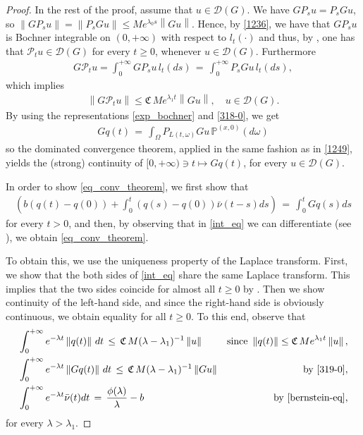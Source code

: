 \documentclass[reqno]{amsart}
\theoremstyle{remark}
\numberwithin{equation}{section} %
\newcommand{\DD}{\mathcal{D}}
\newcommand{\1}{\mathds{1}}
\begin{document}
\begin{proof}
		In the rest of the proof, assume that $u \in \mathcal{D}(G)$. We have $GP_su=P_sGu$, so  $\left\|  GP_s u\right\| = \left\|  P_s Gu\right\| \leq { M e^{\lambda_0 s}} \left\| Gu \right\|$. Hence, {by \eqref{1236}, we have that $GP_su$ is Bochner integrable on $(0, +\infty)$ with respect to $l_t(\cdot)$} and thus, by \cite[Proposition 3.7.12]{hille1996functional}, one has that $\mathcal{P}_tu \in \mathcal{D}(G)$ for every $t \geq 0$, whenever $u \in \mathcal{D}(G)$. Furthermore
		\begin{align}
			G\mathcal{P}_t u = \int_0^{+\infty} GP_su \, l_t(ds) \, = \, \int_0^{+\infty} P_sGu \, l_t(ds),
			\label{318-0}
		\end{align}
		which implies
		\begin{align}
			\left\| G \mathcal{P}_tu  \right\| \leq {\mathfrak{C}\,Me^{\lambda_1 t}} \left\| Gu \right\|, \quad u\in \DD(G).
			\label{319-0}
		\end{align}
		By using the representations \eqref{exp_bochner} and \eqref{318-0}, we get
		\begin{align}
			Gq(t) \, = \, \int_{\Omega} P_{L(t, \omega)} G u \, \mathds{P}^{(x,0)}(d\omega)
		\end{align}
		so the dominated convergence theorem, {applied in the same fashion as in \eqref{1249}}, yields the (strong) continuity of $[0, +\infty) \ni t \mapsto Gq(t) $, for every $u \in \mathcal{D}(G)$. 
		
		In order to show \eqref{eq_conv_theorem}, we first show that
		\begin{align}
			\left(  b(q(t)-q(0))+   \int_0^t (q(s)-q(0)) \bar{\nu}(t-s)ds \right) \, = \, \int_0^t Gq(s) ds
			\label{int_eq}
		\end{align}
		for every $t > 0$, and then, by observing that in \eqref{int_eq} we can differentiate (see \cite[Chapter XIII]{Bochner}), we obtain \eqref{eq_conv_theorem}.
		
		To obtain this, we use the uniqueness property of the Laplace transform. First, we show that the both sides of \eqref{int_eq} share the same Laplace transform. This implies that the two sides coincide for almost all $t \geq 0$ by \cite[Theorem 1.7.3]{arendt2001cauchy}. Then we show continuity of the left-hand side, and since the right-hand side is obviously continuous, we obtain equality for all $t \geq 0$. {To this end, observe that
			\begin{align*}
				& \int_0^{+\infty} e^{-\lambda t} \left\| q(t) \right\| \, dt \, \leq  \, \mathfrak{C}\,M(\lambda-\lambda_1)^{-1} \left\| u \right\| & \text{since } \left\|q(t) \right\| \leq \mathfrak{C}\,Me^{\lambda_1 t}\left\| u \right\|,\\
				& \int_0^{+\infty} e^{-\lambda t}  \left\| Gq(t) \right\| \, dt \, \leq  \, \mathfrak{C}\,M(\lambda-\lambda_1)^{-1} \left\| 
				Gu \right\|& \text{by \eqref{319-0}}, \\
				& \int_0^{+\infty} e^{-\lambda t} \bar{\nu}(t) dt\, = \, \frac{\phi(\lambda)}{\lambda}-b & \text{by \eqref{bernstein-eq},}
			\end{align*}
			for every $\lambda > \lambda_1$.}
		

\end{proof}
\end{document}
